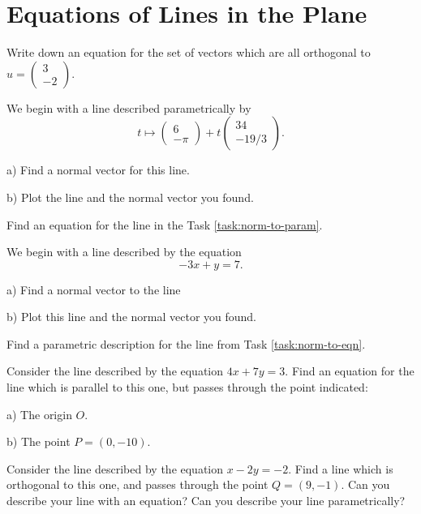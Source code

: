 \documentclass[cahier-main.tex]{subfiles}
\begin{document}
\section*{Equations of Lines in the Plane}

\begin{task}
Write down an equation for the set of vectors which are all orthogonal to $u=\left(\begin{smallmatrix} 3 \\ -2\end{smallmatrix}\right)$.
\end{task}

\begin{task}\label{task:norm-to-param}
We begin with a line described parametrically by
\[
t \mapsto \begin{pmatrix} 6\\ -\pi \end{pmatrix} + t \begin{pmatrix} 34 \\ -19/3\end{pmatrix}.
\]
\begin{compactitem}
\item[a)] Find a normal vector for this line.
\item[b)] Plot the line and the normal vector you found.
\end{compactitem}
\end{task}

\begin{task}
Find an equation for the line in the Task \ref{task:norm-to-param}.
\end{task}

\clearpage

\begin{task}\label{task:norm-to-eqn}
We begin with a line described by the equation
\[
-3x + y =7.
\]
\begin{compactitem}
\item[a)] Find a normal vector to the line
\item[b)] Plot this line and the normal vector you found.
\end{compactitem}
\end{task}

\begin{task}
Find a parametric description for the line from Task \ref{task:norm-to-eqn}.
\end{task}

\begin{task}
Consider the line described by the equation $4x+7y=3$. Find an equation for the line which is parallel to this one, but passes through the point indicated:
\begin{compactitem}
\item[a)] The origin $O$.
\item[b)] The point $P = (0,-10)$.
\end{compactitem}
\end{task}

\begin{challenge}
Consider the line described by the equation $x -2y = -2$. Find a line which is orthogonal to this one, and passes through the point $Q=(9,-1)$. Can you describe your line with an equation? Can you describe your line parametrically?
\end{challenge}
\end{document}
